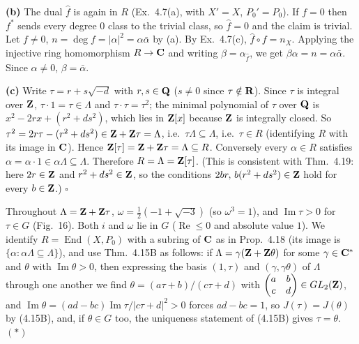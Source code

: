 \documentclass[11pt]{article}
\begin{document}
\textbf{(b)} The dual $\widehat f$ is again in $R$ (Ex.~4.7(a), with $X'=X$, $P_0'=P_0$). If $f=0$ then $f^*$ sends every degree $0$ class to the trivial class, so $\widehat f=0$ and the claim is trivial. Let $f\ne0$, $n=\deg f=|\alpha|^2=\alpha\bar\alpha$ by (a). By Ex.~4.7(c), $\widehat f\circ f=n_X$. Applying the injective ring homomorphism $R\to\mathbf C$ and writing $\beta=\alpha_{\widehat f}$, we get $\beta\alpha=n=\alpha\bar\alpha$. Since $\alpha\ne0$, $\beta=\bar\alpha$.

\textbf{(c)} Write $\tau=r+s\sqrt{-d}$ with $r,s\in\mathbf Q$ ($s\neq0$ since $\tau\notin\mathbf R$). Since $\tau$ is integral over $\mathbf Z$, $\tau\cdot1=\tau\in\Lambda$ and $\tau\cdot\tau=\tau^2$; the minimal polynomial of $\tau$ over $\mathbf Q$ is $x^2-2rx+(r^2+ds^2)$, which lies in $\mathbf Z[x]$ because $\mathbf Z$ is integrally closed. So $\tau^2=2r\tau-(r^2+ds^2)\in\mathbf Z+\mathbf Z\tau=\Lambda$, i.e.\ $\tau\Lambda\subseteq\Lambda$, i.e.\ $\tau\in R$ (identifying $R$ with its image in $\mathbf C$). Hence $\mathbf Z[\tau]=\mathbf Z+\mathbf Z\tau=\Lambda\subseteq R$. Conversely every $\alpha\in R$ satisfies $\alpha=\alpha\cdot1\in\alpha\Lambda\subseteq\Lambda$. Therefore $R=\Lambda=\mathbf Z[\tau]$. (This is consistent with Thm.~4.19: here $2r\in\mathbf Z$ and $r^2+ds^2\in\mathbf Z$, so the conditions $2br,\,b(r^2+ds^2)\in\mathbf Z$ hold for every $b\in\mathbf Z$.) \hfill$\square$

\pf
Throughout $\Lambda=\mathbf Z+\mathbf Z\tau$, $\omega=\frac12(-1+\sqrt{-3})$ (so $\omega^3=1$), and $\operatorname{Im}\tau>0$ for $\tau\in G$ (Fig.~16). Both $i$ and $\omega$ lie in $G$ ($\operatorname{Re}\le0$ and absolute value $1$). We identify $R=\operatorname{End}(X,P_0)$ with a subring of $\mathbf C$ as in Prop.~4.18 (its image is $\{\alpha:\alpha\Lambda\subseteq\Lambda\}$), and use Thm.~4.15B as follows: if $\Lambda=\gamma(\mathbf Z+\mathbf Z\theta)$ for some $\gamma\in\mathbf C^*$ and $\theta$ with $\operatorname{Im}\theta>0$, then expressing the basis $(1,\tau)$ and $(\gamma,\gamma\theta)$ of $\Lambda$ through one another we find $\theta=(a\tau+b)/(c\tau+d)$ with $\begin{pmatrix}a&b\\c&d\end{pmatrix}\in GL_2(\mathbf Z)$, and $\operatorname{Im}\theta=(ad-bc)\operatorname{Im}\tau/|c\tau+d|^2>0$ forces $ad-bc=1$, so $J(\tau)=J(\theta)$ by (4.15B), and, if $\theta\in G$ too, the uniqueness statement of (4.15B) gives $\tau=\theta$. $(\ast)$
\end{document}
